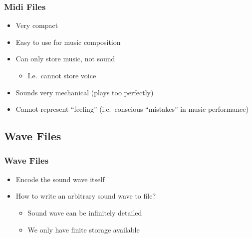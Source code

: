\begin{frame}
  \frametitle{Midi Files}
  \begin{itemize}
    \item Very compact
    \item Easy to use for music composition
  \end{itemize}
  \vskip5mm
  \begin{itemize}
    \item Can only store music, not sound
          \begin{itemize}
            \item I.e.~cannot store voice
          \end{itemize}
    \item Sounds very mechanical (plays too perfectly)
    \item Cannot represent ``feeling'' (i.e.~conscious ``mistakes'' in music performance)
  \end{itemize}
\end{frame}


\subsection{Wave Files}

\frame{\tableofcontents[currentsubsection]}

\begin{frame}
  \frametitle{Wave Files}
  \begin{itemize}
    \item Encode the sound wave itself
    \item How to write an arbitrary sound wave to file?
          \begin{itemize}
            \item Sound wave can be infinitely detailed
            \item We only have finite storage available
          \end{itemize}
  \end{itemize}
  \begin{center}
  \end{center}
\end{frame}

